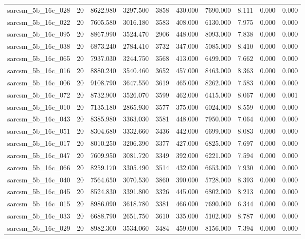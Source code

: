 \begin{tabular}{lrrrrrrrrr}
sarcsm\_5b\_16c\_028 & 20 & 8622.980 & 3297.500 & 3858 & 430.000 & 7690.000 & 8.111 & 0.000 & 0.000 \\
sarcsm\_5b\_16c\_022 & 20 & 7605.580 & 3016.180 & 3583 & 408.000 & 6130.000 & 7.975 & 0.000 & 0.000 \\
sarcsm\_5b\_16c\_095 & 20 & 8867.990 & 3524.470 & 2906 & 448.000 & 8093.000 & 7.838 & 0.000 & 0.000 \\
sarcsm\_5b\_16c\_038 & 20 & 6873.240 & 2784.410 & 3732 & 347.000 & 5085.000 & 8.410 & 0.000 & 0.000 \\
sarcsm\_5b\_16c\_065 & 20 & 7937.030 & 3244.750 & 3568 & 413.000 & 6499.000 & 7.662 & 0.000 & 0.000 \\
sarcsm\_5b\_16c\_016 & 20 & 8880.240 & 3540.460 & 3652 & 457.000 & 8463.000 & 8.363 & 0.000 & 0.000 \\
sarcsm\_5b\_16c\_006 & 20 & 9108.790 & 3647.550 & 3619 & 465.000 & 8262.000 & 7.583 & 0.000 & 0.000 \\
sarcsm\_5b\_16c\_072 & 20 & 8732.900 & 3526.070 & 3599 & 462.000 & 6415.000 & 8.067 & 0.000 & 0.001 \\
sarcsm\_5b\_16c\_010 & 20 & 7135.180 & 2865.930 & 3577 & 375.000 & 6024.000 & 8.559 & 0.000 & 0.000 \\
sarcsm\_5b\_16c\_043 & 20 & 8385.980 & 3363.030 & 3581 & 448.000 & 7950.000 & 7.064 & 0.000 & 0.000 \\
sarcsm\_5b\_16c\_051 & 20 & 8304.680 & 3332.660 & 3436 & 442.000 & 6699.000 & 8.083 & 0.000 & 0.000 \\
sarcsm\_5b\_16c\_017 & 20 & 8010.250 & 3206.390 & 3377 & 427.000 & 6825.000 & 7.697 & 0.000 & 0.000 \\
sarcsm\_5b\_16c\_047 & 20 & 7609.950 & 3081.720 & 3349 & 392.000 & 6221.000 & 7.594 & 0.000 & 0.000 \\
sarcsm\_5b\_16c\_066 & 20 & 8259.170 & 3305.490 & 3514 & 432.000 & 6653.000 & 7.930 & 0.000 & 0.000 \\
sarcsm\_5b\_16c\_040 & 20 & 7564.650 & 3070.530 & 3860 & 390.000 & 5728.000 & 8.393 & 0.000 & 0.000 \\
sarcsm\_5b\_16c\_045 & 20 & 8524.830 & 3391.800 & 3326 & 445.000 & 6802.000 & 8.213 & 0.000 & 0.000 \\
sarcsm\_5b\_16c\_015 & 20 & 8986.090 & 3618.780 & 3381 & 466.000 & 7690.000 & 6.344 & 0.000 & 0.000 \\
sarcsm\_5b\_16c\_033 & 20 & 6688.790 & 2651.750 & 3610 & 335.000 & 5102.000 & 8.787 & 0.000 & 0.000 \\
sarcsm\_5b\_16c\_029 & 20 & 8982.300 & 3534.060 & 3484 & 459.000 & 8156.000 & 7.394 & 0.000 & 0.000 \\

\end{tabular}
